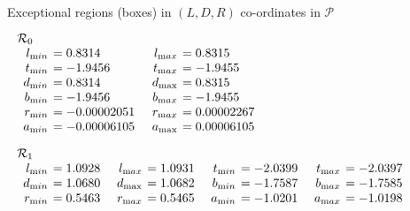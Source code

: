 \begin{table}\label{GMT tab 1.2}
\caption{Exceptional regions (boxes) in $(L,D,R)$ co-ordinates in $\mathcal {P}$}
\begin{small}
$$
\begin{array}{rlrl}
\noalign{\noindent  $\mathcal {R}_0$}
\noalign{\vskip2pt}
l_{\textrm min} &\hskip-6pt =  0.8314&\enspace    l_{\textrm max}&\hskip-6pt  = 0.8315\\
t_{\textrm min} &\hskip-6pt =  -1.9456&\enspace    t_{\textrm max}&\hskip-6pt  = -1.9455\\
d_{\textrm min} &\hskip-6pt =  0.8314&  d_\mathrm {max}&\hskip-6pt  = 0.8315\\   b_{\textrm min} &\hskip-6pt =  -1.9456&  b_{\textrm max} &\hskip-6pt = -1.9455\\
r_{\textrm min} &\hskip-6pt =  -0.00002051&  r_{\textrm max} &\hskip-6pt = 0.00002267\\  a_{\textrm min} &\hskip-6pt =  -0.00006105&  a_\mathrm {max}&\hskip-6pt  = 0.00006105\end{array}
$$



$$\begin{array}{rlrlrlrl}
\noalign{\noindent  $\mathcal {R}_1$}
\noalign{\vskip2pt}
l_{\textrm min} &\hskip-6pt =  1.0928&\enspace    l_{\textrm max} &\hskip-6pt = 1.0931&\enspace   
t_{\textrm min} &\hskip-6pt =  -2.0399&\enspace   t_{\textrm max}&\hskip-6pt  = -2.0397\\
d_{\textrm min} &\hskip-6pt =  1.0680&  d_\mathrm {max}&\hskip-6pt  = 1.0682&   b_{\textrm min} &\hskip-6pt =  -1.7587&  b_{\textrm max} &\hskip-6pt = -1.7585\\
r_{\textrm min} &\hskip-6pt =  0.5463& 
r_{\textrm max}&\hskip-6pt  = 0.5465&   a_{\textrm min} &\hskip-6pt =  -1.0201&  a_{\textrm max}&\hskip-6pt  = -1.0198\end{array}$$


\end{small}
\end{table}
